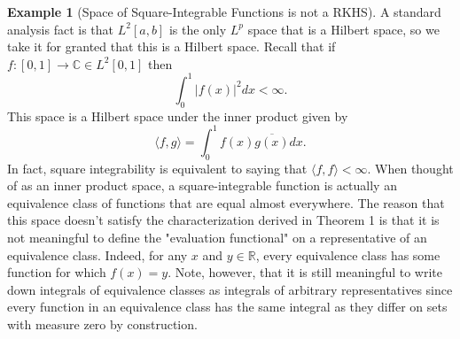 \documentclass{article}
\theoremstyle{definition}
\newtheorem{exmp}[thm]{Example}
\theoremstyle{remark}
\numberwithin{equation}{section}
\begin{document}
\begin{exmp}[Space of Square-Integrable Functions is not a RKHS]

A standard analysis fact is that $L^2[a, b]$ is the only $L^p$ space that is a Hilbert space, so we take it for granted that this is a Hilbert space. Recall that if $f : [0,1] \rightarrow \mathbb{C} \in L^2[0,1]$ then 
$$\int _0 ^1 | f(x)|^2 dx < \infty.$$
 This space is a Hilbert space under the inner product given by 
$$\langle f, g \rangle = \int _0 ^1 f(x) \overline{g(x)} dx. $$
In fact, square integrability is equivalent to saying that $\langle f, f \rangle < \infty. $ When thought of as an inner product space, a square-integrable function is actually an equivalence class of functions that are equal almost everywhere.
 The reason that this space doesn't satisfy the characterization derived in Theorem 1 is that it is not meaningful to define the "evaluation functional" on a representative of an equivalence class. Indeed, for any $x$ and $y \in \mathbb{R}$, every equivalence class has some function for which $f(x) = y$. Note, however, that it is still meaningful to write down integrals of equivalence classes as integrals of arbitrary representatives since every function in an equivalence class has the same integral as they differ on sets with measure zero by construction.
\end{exmp} 
\end{document}
